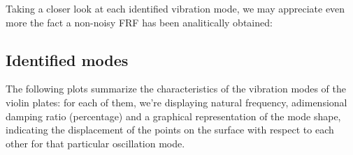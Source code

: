 \documentclass[a4paper,12pt,oneside]{article}
\begin{document}
Taking a closer look at each identified vibration mode, we may appreciate even more the fact a non-noisy FRF has been analitically obtained:



\subsection{Identified modes}

The following plots summarize the characteristics of the vibration modes of the violin plates: for each of them, we're displaying natural frequency, adimensional damping ratio (percentage) and a graphical representation of the mode shape, indicating the displacement of the points on the surface with respect to each other for that particular oscillation mode.

\begin{figure}[H]
	 \quad
	 \\

\end{figure}
\end{document}
